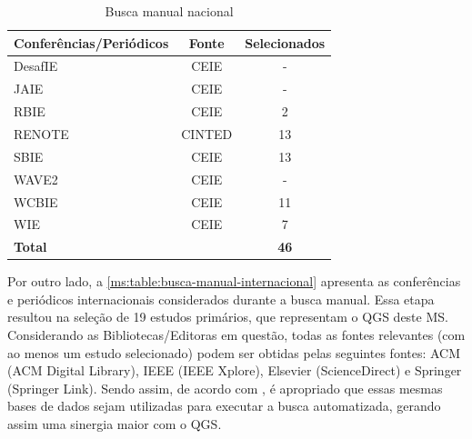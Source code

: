 \begin{table}[htbp]
\centering
\caption{Busca manual nacional}
\label{ms:table:busca-manual-nacional}
\begin{tabular}{lcc}
\hline
\textbf{Conferências/Periódicos} & \textbf{Fonte} & \textbf{Selecionados} \\ \hline
DesafIE                          & CEIE           & -                     \\
JAIE                             & CEIE           & -                     \\
RBIE                             & CEIE           & 2                     \\
RENOTE                           & CINTED         & 13                    \\
SBIE                             & CEIE           & 13                    \\
WAVE2                            & CEIE           & -                     \\
WCBIE                            & CEIE           & 11                    \\
WIE                              & CEIE           & 7                     \\
\multicolumn{2}{l}{\textbf{Total}}                & \textbf{46}           \\ \hline
\end{tabular}
\fautor
\end{table}

Por outro lado, a \autoref{ms:table:busca-manual-internacional} apresenta as conferências e periódicos internacionais considerados durante a busca manual. Essa etapa resultou na seleção de 19 estudos primários, que representam o QGS deste MS. Considerando as Bibliotecas/Editoras em questão, todas as fontes relevantes (com ao menos um estudo selecionado) podem ser obtidas pelas seguintes fontes: ACM (ACM Digital Library), IEEE (IEEE Xplore), Elsevier (ScienceDirect) e Springer (Springer Link). Sendo assim, de acordo com , é apropriado que essas mesmas bases de dados sejam utilizadas para executar a busca automatizada, gerando assim uma sinergia maior com o QGS.

